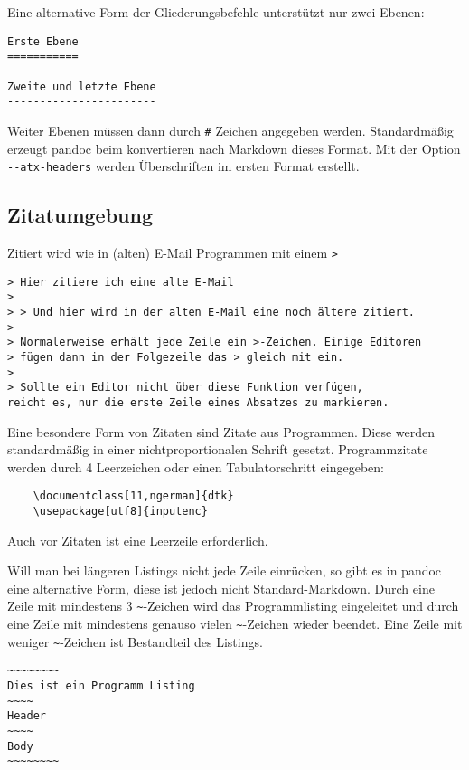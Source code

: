 \documentclass[11pt,ngerman,a4paper]{article}
\begin{document}
Eine alternative Form der Gliederungsbefehle unterstützt nur zwei
Ebenen:

\begin{verbatim}
Erste Ebene
===========

Zweite und letzte Ebene
-----------------------
\end{verbatim}

Weiter Ebenen müssen dann durch \texttt{\#} Zeichen angegeben werden.
Standardmäßig erzeugt pandoc beim konvertieren nach Markdown dieses
Format. Mit der Option \texttt{-{}-atx-headers} werden Überschriften im
ersten Format erstellt.

\subsection{Zitatumgebung}

Zitiert wird wie in (alten) E-Mail Programmen mit einem
\texttt{\textgreater{}}

\begin{verbatim}
> Hier zitiere ich eine alte E-Mail
>
> > Und hier wird in der alten E-Mail eine noch ältere zitiert.
>
> Normalerweise erhält jede Zeile ein >-Zeichen. Einige Editoren
> fügen dann in der Folgezeile das > gleich mit ein.
>
> Sollte ein Editor nicht über diese Funktion verfügen,
reicht es, nur die erste Zeile eines Absatzes zu markieren.
\end{verbatim}

Eine besondere Form von Zitaten sind Zitate aus Programmen. Diese werden
standardmäßig in einer nichtproportionalen Schrift gesetzt.
Programmzitate werden durch 4 Leerzeichen oder einen Tabulatorschritt
eingegeben:

\begin{verbatim}
    \documentclass[11,ngerman]{dtk}
    \usepackage[utf8]{inputenc}
\end{verbatim}

Auch vor Zitaten ist eine Leerzeile erforderlich.

Will man bei längeren Listings nicht jede Zeile einrücken, so gibt es in
pandoc eine alternative Form, diese ist jedoch nicht Standard-Markdown.
Durch eine Zeile mit mindestens 3 \texttt{\textasciitilde{}}-Zeichen
wird das Programmlisting eingeleitet und durch eine Zeile mit mindestens
genauso vielen \texttt{\textasciitilde{}}-Zeichen wieder beendet. Eine
Zeile mit weniger \texttt{\textasciitilde{}}-Zeichen ist Bestandteil des
Listings.

\begin{verbatim}
~~~~~~~~
Dies ist ein Programm Listing
~~~~
Header
~~~~
Body
~~~~~~~~
\end{verbatim}
\end{document}
